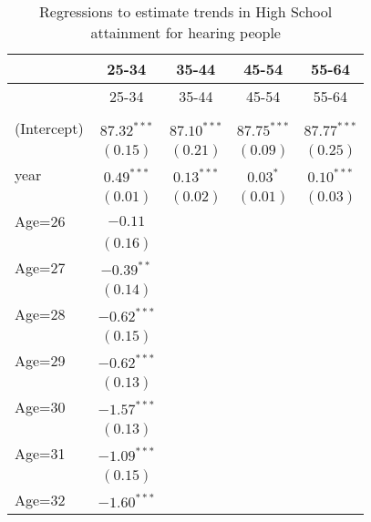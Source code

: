 \documentclass[fullpage]{paper}
\begin{document}
\begin{center}
\begin{longtable}{l c c c c }
\hline
 & 25-34 & 35-44 & 45-54 & 55-64 \\
\hline
\endfirsthead
\hline
 & 25-34 & 35-44 & 45-54 & 55-64 \\
\hline
\endhead
\hline
\endfoot
\hline
\multicolumn{5}{l}{\scriptsize{$^{***}p<0.001$, $^{**}p<0.01$, $^*p<0.05$}}\\
\caption{Regressions to estimate trends in High School attainment for hearing people}
\label{table:coefficients}
\endlastfoot
(Intercept) & $87.32^{***}$ & $87.10^{***}$ & $87.75^{***}$ & $87.77^{***}$ \\
            & $(0.15)$      & $(0.21)$      & $(0.09)$      & $(0.25)$      \\
year        & $0.49^{***}$  & $0.13^{***}$  & $0.03^{*}$    & $0.10^{***}$  \\
            & $(0.01)$      & $(0.02)$      & $(0.01)$      & $(0.03)$      \\
Age=26      & $-0.11$       &               &               &               \\
            & $(0.16)$      &               &               &               \\
Age=27      & $-0.39^{**}$  &               &               &               \\
            & $(0.14)$      &               &               &               \\
Age=28      & $-0.62^{***}$ &               &               &               \\
            & $(0.15)$      &               &               &               \\
Age=29      & $-0.62^{***}$ &               &               &               \\
            & $(0.13)$      &               &               &               \\
Age=30      & $-1.57^{***}$ &               &               &               \\
            & $(0.13)$      &               &               &               \\
Age=31      & $-1.09^{***}$ &               &               &               \\
            & $(0.15)$      &               &               &               \\
Age=32      & $-1.60^{***}$ &               &               &               \\

\end{longtable}
\end{center}
\end{document}
